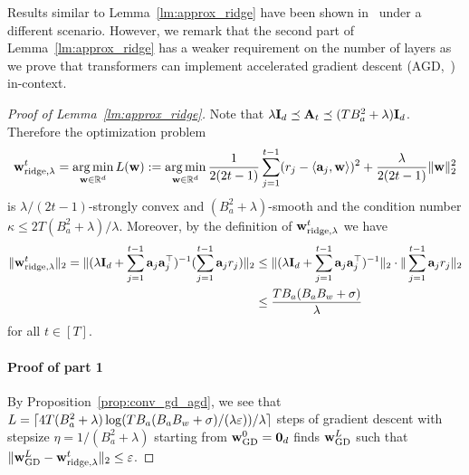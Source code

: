 Results similar to Lemma~\ref{lm:approx_ridge} have been shown in~\cite{bai2023transformers} under a different scenario.   However, we remark that  the second part of Lemma~\ref{lm:approx_ridge} has a weaker requirement on the number of layers as we prove that transformers can implement accelerated gradient descent (AGD,~\cite{nesterov2003introductory}) in-context.


\begin{proof}[Proof of Lemma~\ref{lm:approx_ridge}]
Note that $\lambda{\mathbf I}_d\preceq {\mathbf A}_t\preceq (TB_a^2+\lambda){\mathbf I}_d$. Therefore the optimization problem 
$${\mathbf w}^t_{{\rm ridge},\lambda}=\operatorname*{arg\,min}_{{\mathbf w}\in\mathbb{R}^d}L({\mathbf w}):=\operatorname*{arg\,min}_{{\mathbf w}\in\mathbb{R}^d}\frac{1}{2(2t-1)}\sum_{j=1}^{t-1}(r_j-\left\langle{\mathbf a}_j,{\mathbf w}\right\rangle)^2+\frac{\lambda}{2(2t-1)}\|{\mathbf w}\|_2^2$$
is $\lambda/(2t-1)$-strongly convex  and $(B_a^2+\lambda)$-smooth and the condition number $\kappa\leq 2T(B_a^2+\lambda)/\lambda$. Moreover, by the definition of ${\mathbf w}_{{\rm ridge},\lambda}^t$ we have 
\begin{align*}
    \|{\mathbf w}^t_{{\rm ridge},\lambda}\|_2=\|(\lambda{\mathbf I}_d+\sum_{j=1}^{t-1}{\mathbf a}_j{\mathbf a}_j^\top)^{-1}(\sum_{j=1}^{t-1}{\mathbf a}_jr_j)\|_2&\leq 
    \|(\lambda{\mathbf I}_d+\sum_{j=1}^{t-1}{\mathbf a}_j{\mathbf a}_j^\top)^{-1}\|_2\cdot\|\sum_{j=1}^{t-1}{\mathbf a}_jr_j\|_2\\&\leq
    \frac{TB_a(B_aB_w+\sigma)}{\lambda}
\end{align*} 
for all $t\in[T]$. 
\paragraph{Proof of part 1}
By Proposition~\ref{prop:conv_gd_agd}, we see that $L=\lceil4T(B_a^2+\lambda)\log({TB_a(B_aB_w+\sigma)}/({\lambda}\varepsilon))/\lambda\rceil$ steps of gradient descent with stepsize $\eta=1/(B_a^2+\lambda)$ starting from ${\mathbf w}_{{\mathrm{GD}}}^0={\mathbf 0}_d$ finds ${\mathbf w}^L_{\mathrm{GD}}$ such that $\|{\mathbf w}^L_{{\mathrm{GD}}}-{\mathbf w}^t_{{\rm ridge},\lambda}\|_2\leq\varepsilon$.


\end{proof}
